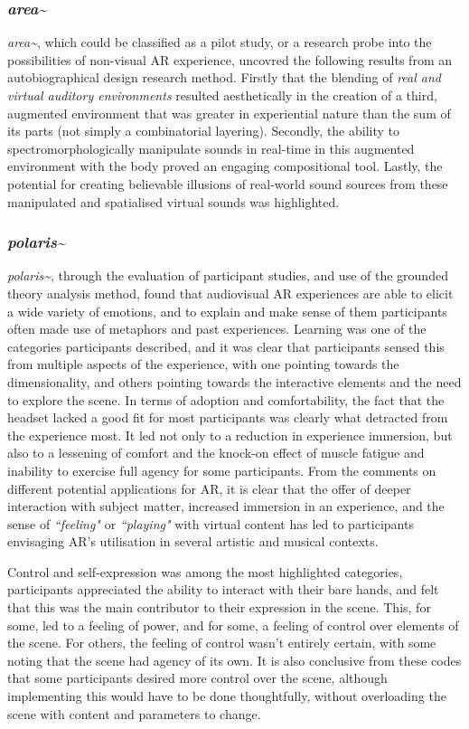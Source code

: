 \subsubsection{\textit{area\textasciitilde{}}}
\textit{area\textasciitilde{}}, which could be classified as a pilot study, or a research probe into the possibilities of non-visual AR experience, uncovred the following results from an autobiographical design research method. Firstly that the blending of \textit{real and virtual auditory environments} resulted aesthetically in the creation of a third, augmented environment that was greater in experiential nature than the sum of its parts (not simply a combinatorial layering). Secondly, the ability to spectromorphologically manipulate sounds in real-time in this augmented environment with the body proved an engaging compositional tool. Lastly, the potential for creating believable illusions of real-world sound sources from these manipulated and spatialised virtual sounds was highlighted.

\subsubsection{\textit{polaris\textasciitilde{}}}
\textit{polaris\textasciitilde{}}, through the evaluation of participant studies, and use of the grounded theory analysis method, found that audiovisual AR experiences are able to elicit a wide variety of emotions, and to explain and make sense of them participants often made use of metaphors and past experiences. Learning was one of the categories participants described, and it was clear that participants sensed this from multiple aspects of the experience, with one pointing towards the dimensionality, and others pointing towards the interactive elements and the need to explore the scene. In terms of adoption and comfortability, the fact that the headset lacked a good fit for most participants was clearly what detracted from the experience most. It led not only to a reduction in experience immersion, but also to a lessening of comfort and the knock-on effect of muscle fatigue and inability to exercise full agency for some participants. From the comments on different potential applications for AR, it is clear that the offer of deeper interaction with subject matter, increased immersion in an experience, and the sense of \textit{``feeling"} or \textit{``playing"} with virtual content has led to participants envisaging AR’s utilisation in several artistic and musical contexts. 

Control and self-expression was among the most highlighted categories, participants appreciated the ability to interact with their bare hands, and felt that this was the main contributor to their expression in the scene. This, for some, led to a feeling of power, and for some, a feeling of control over elements of the scene. For others, the feeling of control wasn’t entirely certain, with some noting that the scene had agency of its own. It is also conclusive from these codes that some participants desired more control over the scene, although implementing this would have to be done thoughtfully, without overloading the scene with content and parameters to change.

